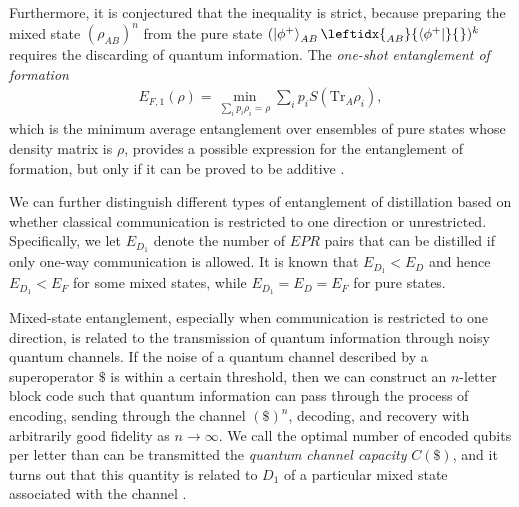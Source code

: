 \documentclass[a4paper, 12pt]{article}
\numberwithin{equation}{section}
\numberwithin{figure}{section}
\theoremstyle{definition}
\begin{document}
    Furthermore, it is conjectured that the inequality is strict, because preparing the mixed state $(\rho_{AB})^n$ from the pure state $(\ket{\phi^+}_{AB} \leftidx{_{AB}^{}}{\bra{\phi^+}}{_{}^{}})^k$ requires the discarding of quantum information. The \textit{one-shot entanglement of formation}
    \begin{align}
        E_{F, 1}(\rho) = \min_{\sum_i p_i \rho_i = \rho} \sum_i p_i S(\text{Tr}_A \rho_i),
    \end{align}
    which is the minimum average entanglement over ensembles of pure states whose density matrix is $\rho$, provides a possible expression for the entanglement of formation, but only if it can be proved to be additive \cite{shor}. \par
    We can further distinguish different types of entanglement of distillation based on whether classical communication is restricted to one direction or unrestricted. Specifically, we let $E_{D_1}$ denote the number of $EPR$ pairs that can be distilled if only one-way communication is allowed. It is known that $E_{D_1} < E_D$ and hence $E_{D_1} < E_F$ for some mixed states, while $E_{D_1} = E_D = E_F$ for pure states. \par
    Mixed-state entanglement, especially when communication is restricted to one direction, is related to the transmission of quantum information through noisy quantum channels. If the noise of a quantum channel described by a superoperator $\$$ is within a certain threshold, then we can construct an $n$-letter block code such that quantum information can pass through the process of encoding, sending through the channel $(\$)^n$, decoding, and recovery with arbitrarily good fidelity as $n \to \infty$. We call the optimal number of encoded qubits per letter than can be transmitted the \textit{quantum channel capacity} $C(\$)$, and it turns out that this quantity is related to $D_1$ of a particular mixed state associated with the channel \cite{preskill}.
\end{document}
